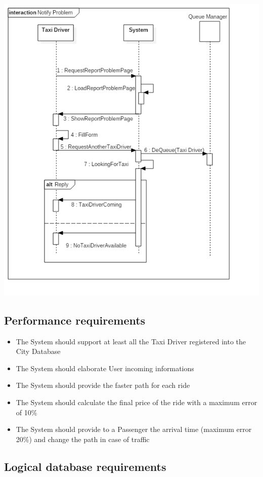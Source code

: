 \documentclass[english]{article}
\begin{document}
\includegraphics[width=\textwidth]{NotifyProblem}

\subsection{Performance requirements}
	\begin{itemize}
		\item The System should support at least all the Taxi Driver registered into the City Database
		\item The System should elaborate User incoming informations
		\item The System should provide the faster path for each ride
		\item The System should calculate the final price of the ride with a maximum error of 10\%
		\item The System should provide to a Passenger the arrival time (maximum error 20\%) and change the path in case of traffic
	\end{itemize}
	
\subsection{Logical database requirements}
\end{document}
